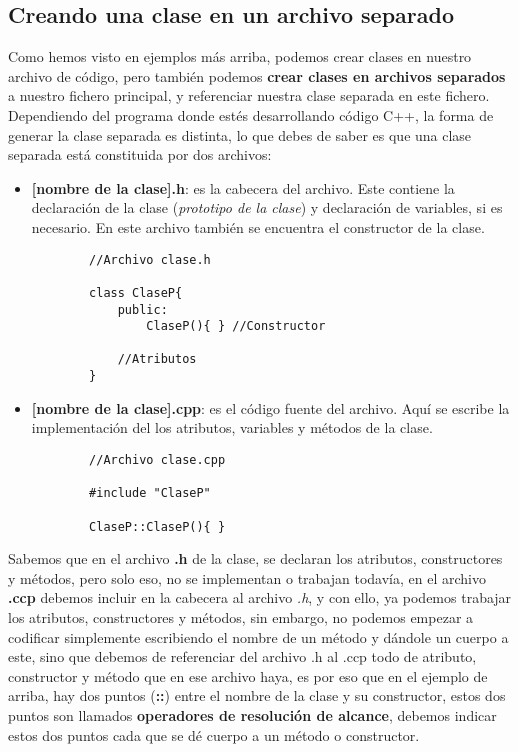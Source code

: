 \subsection{Creando una clase en un archivo separado}
Como hemos visto en ejemplos más arriba, podemos crear clases en nuestro archivo de código, pero también podemos \textbf{crear clases en archivos separados} a nuestro fichero principal, y referenciar nuestra clase separada en este fichero. Dependiendo del programa donde estés desarrollando código C++, la forma de generar la clase separada es distinta, lo que debes de saber es que una clase separada está constituida por dos archivos:
\begin{itemize}
    \item \textbf{[nombre de la clase].h}: es la cabecera del archivo. Este contiene la declaración de la clase (\textit{prototipo de la clase}) y declaración de variables, si es necesario. En este archivo también se encuentra el constructor de la clase.
    \begin{lstlisting}
        //Archivo clase.h
        
        class ClaseP{
            public:
                ClaseP(){ } //Constructor
            
            //Atributos
        }
    \end{lstlisting}
    \item \textbf{[nombre de la clase].cpp}: es el código fuente del archivo. Aquí se escribe la implementación del los atributos, variables y métodos de la clase.
    \begin{lstlisting}
        //Archivo clase.cpp
        
        #include "ClaseP"
        
        ClaseP::ClaseP(){ }
    \end{lstlisting}
\end{itemize}
Sabemos que en el archivo \textbf{.h} de la clase, se declaran los atributos, constructores y métodos, pero solo eso, no se implementan o trabajan todavía, en el archivo \textbf{.ccp} debemos incluir en la cabecera al archivo \textit{.h}, y con ello, ya podemos trabajar los atributos, constructores y métodos, sin embargo, no podemos empezar a codificar simplemente escribiendo el nombre de un método y dándole un cuerpo a este, sino que debemos de referenciar del archivo .h al .ccp todo de atributo, constructor y método que en ese archivo haya, es por eso que en el ejemplo de arriba, hay dos puntos (\textbf{::}) entre el nombre de la clase y su constructor, estos dos puntos son llamados \textbf{operadores de resolución de alcance}, debemos indicar estos dos puntos cada que se dé cuerpo a un método o constructor.
